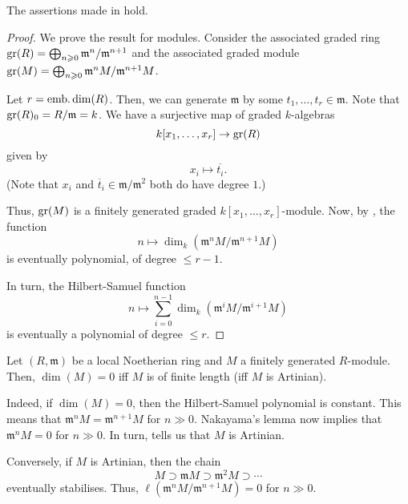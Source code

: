 \documentclass[12pt]{article}
\begin{document}
\begin{prop} \label{prop:hilbert-samuel-function}
	The assertions made in  hold.
\end{prop}
\begin{proof} 
	We prove the result for modules. Consider the associated graded ring $\operatorname{gr}(R) = \bigoplus_{n \geqslant 0} \mathfrak{m}^{n}/\mathfrak{m}^{n + 1}$ and the associated graded module $\operatorname{gr}(M) = \bigoplus_{n \geqslant 0} \mathfrak{m}^{n} M/\mathfrak{m}^{n + 1} M$.

	Let $r = \operatorname{emb.dim}(R)$. Then, we can generate $\mathfrak{m}$ by some $t_{1}, \ldots, t_{r} \in \mathfrak{m}$. Note that $\operatorname{gr}(R)_{0} = R/\mathfrak{m} = k$. We have a surjective map of graded $k$-algebras 
	\begin{equation*} 
		k[x_{1}, \ldots, x_{r}] \to \operatorname{gr}(R)
	\end{equation*}
	given by
	\begin{equation*} 
		x_{i} \mapsto \overline{t_{i}}.	
	\end{equation*}
	(Note that $x_{i}$ and $\overline{t}_{i} \in \mathfrak{m}/\mathfrak{m}^{2}$ both do have degree $1$.)

	Thus, $\operatorname{gr}(M)$ is a finitely generated graded $k[x_{1}, \ldots, x_{r}]$-module. Now, by , the function
	\begin{equation*} 
		n \mapsto \dim_{k}(\mathfrak{m}^{n} M/\mathfrak{m}^{n + 1} M)
	\end{equation*}
	is eventually polynomial, of degree $\le r - 1$.

	In turn, the Hilbert-Samuel function
	\begin{equation*} 
		n \mapsto \sum_{i = 0}^{n - 1} \dim_{k}(\mathfrak{m}^{i} M/\mathfrak{m}^{i + 1} M)
	\end{equation*}
	is eventually a polynomial of degree $\le r$.
\end{proof}

\begin{ex} \label{ex:dim-zero-iff-artinian-module}
	Let $(R, \mathfrak{m})$ be a local Noetherian ring and $M$ a finitely generated $R$-module. \newline
	Then, $\dim(M) = 0$ iff $M$ is of finite length (iff $M$ is Artinian).

	Indeed, if $\dim(M) = 0$, then the Hilbert-Samuel polynomial is constant. This means that $\mathfrak{m}^{n} M = \mathfrak{m}^{n + 1} M$ for $n \gg 0$. Nakayama's lemma now implies that $\mathfrak{m}^{n} M = 0$ for $n \gg 0$. In turn,  tells us that $M$ is Artinian.

	Conversely, if $M$ is Artinian, then the chain
	\begin{equation*} 
		M \supset \mathfrak{m} M \supset \mathfrak{m}^{2} M \supset \cdots
	\end{equation*}
	eventually stabilises. Thus, $\ell(\mathfrak{m}^{n} M/\mathfrak{m}^{n + 1}M) = 0$ for $n \gg 0$.
\end{ex}
\end{document}
